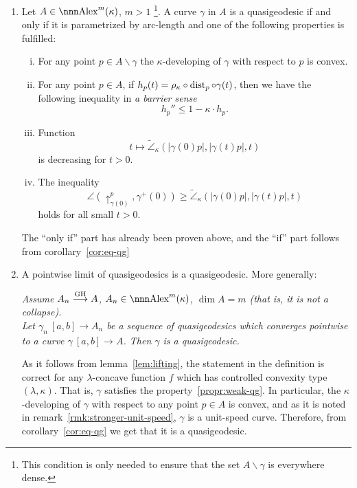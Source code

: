 \documentclass{article}
\begin{document}
\begin{enumerate}\setcounter{enumi}{\value{qg-prop}}

\item \label{thm:eq-def-qg}  Let $A\in\Alex^m(\kappa)$,
$m>1$%
\footnote{This condition is only needed to ensure that the set
$A\backslash\gamma$ is everywhere dense.}.
A curve $\gamma$ in $A$ is a quasigeodesic if and only if it is parametrized by
arc-length and one of the following properties is fulfilled:
\begin{enumerate}[(i)]
\item For any point $p\in A\backslash\gamma$ the $\kappa$-developing of $\gamma$
with respect to $p$ is convex.
\item \label{part:h}For any point $p\in A$, if
$h_p(t)=\rho_\kappa\circ\operatorname{dist}_p\circ\gamma(t)$, then we have the following
inequality in \emph{a barrier sense}
$$h_p''\le 1- \kappa{\cdot} h_p.$$
\item Function
$$t\mapsto \tilde\angle_\kappa(|\gamma(0)p|,|\gamma(t)p|,t)$$
is decreasing for $t>0$.
\item\label{comp-inq} The inequality
$$\angle(\uparrow_{\gamma(0)}^p,\gamma^+(0))\ge
\tilde\angle_\kappa(|\gamma(0)p|,|\gamma(t)p|,t)$$ 
holds for all small $t>0$.
\end{enumerate}
The ``only if'' part has already been proven above, and the ``if'' part follows
from corollary~\ref{cor:eq-qg}

\item\label{pr:limit-qg} A pointwise limit of quasigeodesics is a quasigeodesic.
More generally:

\label{thm:limit-qg}
\textit{Assume $A_n\GHto A$, $A_n\in\Alex^m(\kappa)$, $\dim A=m$ 
(that is, it is not a
collapse).\\
Let $\gamma_n\:[a,b]\to A_n$ be a sequence of quasigeodesics which converges
pointwise to a curve $\gamma\:[a,b]\to A$.
Then $\gamma$ is a quasigeodesic.}


As it follows from lemma~\ref{lem:lifting}, the statement in the
definition is correct for any $\lambda$-concave function $f$ which has
controlled convexity type $(\lambda,\kappa)$.
That is, $\gamma$ satisfies the property~\ref{propr:weak-qg}. 
In particular, the $\kappa$-developing of $\gamma$ with respect to any point $p\in A$ is convex, and as it is noted in remark~\ref{rmk:stronger-unit-speed}, $\gamma$ is a
unit-speed curve.
Therefore, from corollary~\ref{cor:eq-qg} we get that it is a quasigeodesic.

\setcounter{qg-prop}{\value{enumi}}
\end{enumerate}
\end{document}

